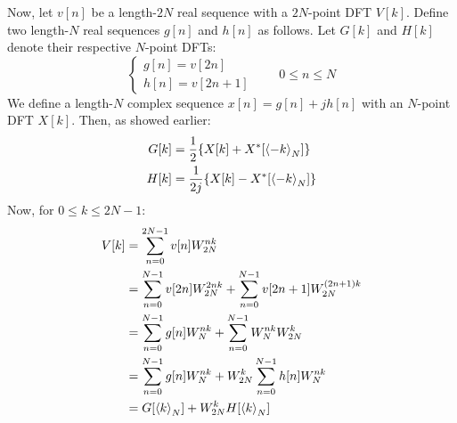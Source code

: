 \documentclass[../../main/main.tex]{subfiles}
\begin{document}
Now, let \( v[n] \) be a length-\( 2N \) real sequence with a \( 2N \)-point DFT \( V[k] \). Define two length-\( N \) real sequences \( g[n] \) and \( h[n] \) as follows. Let \( G[k] \) and \( H[k] \) denote their respective \( N \)-point DFTs:
\begin{equation}
    \begin{cases}
        g[n] = v[2n]    \\
        h[n] = v[2n+1]
    \end{cases}
    \qquad
    0 \le n \le N
    \label{eq:L13_S09_3}
\end{equation}
We define a length-\( N \) complex sequence \( x[n] = g[n] + jh[n] \) with an \( N \)-point DFT \( X[k] \). Then, as showed earlier:
\begin{align}
    G[k] &= \frac{1}{2} \qty{X[k] + X^{*}[\expval{-k}_{N}]} \\
    H[k] &= \frac{1}{2j} \qty{X[k] - X^{*}[\expval{-k}_{N}]}
\end{align}
Now, for \( 0 \le k \le 2N-1 \):
\begin{align}
    V[k]
    &=
        \sum_{n=0}^{2N-1} v[n] W_{2N}^{nk}  \nonumber   \\
    &=
        \sum_{n=0}^{N-1} v[2n] W_{2N}^{2nk} + \sum_{n=0}^{N-1} v[2n+1] W_{2N}^{(2n+1)k} \nonumber   \\
    &=
        \sum_{n=0}^{N-1} g[n] W_{N}^{nk} + \sum_{n=0}^{N-1} W_{N}^{nk} W_{2N}^{k}   \nonumber   \\
    &=
        \sum_{n=0}^{N-1} g[n] W_{N}^{nk} + W_{2N}^{k} \sum_{n=0}^{N-1} h[n] W_{N}^{nk}  \nonumber   \\
    &=
        G[\expval{k}_{N}] + W_{2N}^{k} H[\expval{k}_{N}]
\end{align}
\end{document}
